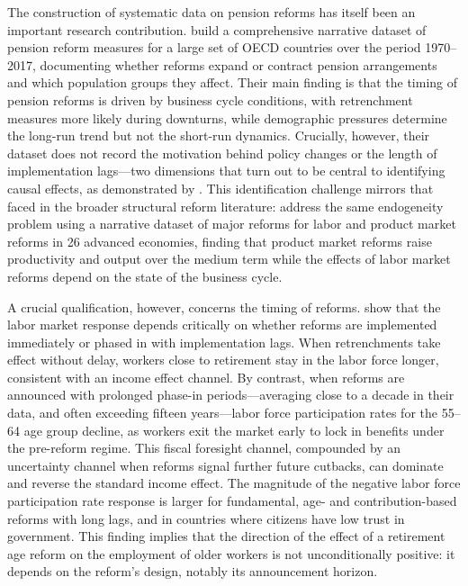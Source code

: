 \documentclass[11pt,english,a4paper, twoside, authoryear]{article}
\begin{document}
The construction of systematic data on pension reforms has itself been an important research contribution. \citet{Beetsma2020} build a comprehensive narrative dataset of pension reform measures for a large set of OECD countries over the period 1970--2017, documenting whether reforms expand or contract pension arrangements and which population groups they affect. Their main finding is that the timing of pension reforms is driven by business cycle conditions, with retrenchment measures more likely during downturns, while demographic pressures determine the long-run trend but not the short-run dynamics. Crucially, however, their dataset does not record the motivation behind policy changes or the length of implementation lags---two dimensions that turn out to be central to identifying causal effects, as demonstrated by \citet{BiZubairy2023}. This identification challenge mirrors that faced in the broader structural reform literature: \citet{DuvalFurceri2018} address the same endogeneity problem using a narrative dataset of major reforms for labor and product market reforms in 26 advanced economies, finding that product market reforms raise productivity and output over the medium term while the effects of labor market reforms depend on the state of the business cycle. %

A crucial qualification, however, concerns the timing of reforms. \citet{BiZubairy2023} show that the labor market response depends critically on whether reforms are implemented immediately or phased in with implementation lags. When retrenchments take effect without delay, workers close to retirement stay in the labor force longer, consistent with an income effect channel. By contrast, when reforms are announced with prolonged phase-in periods---averaging close to a decade in their data, and often exceeding fifteen years---labor force participation rates for the 55--64 age group decline, as workers exit the market early to lock in benefits under the pre-reform regime. This fiscal foresight channel, compounded by an uncertainty channel when reforms signal further future cutbacks, can dominate and reverse the standard income effect. The magnitude of the negative labor force participation rate response is larger for fundamental, age- and contribution-based reforms with long lags, and in countries where citizens have low trust in government. This finding implies that the direction of the effect of a retirement age reform on the employment of older workers is not unconditionally positive: it depends on the reform's design, notably its announcement horizon.
\end{document}
